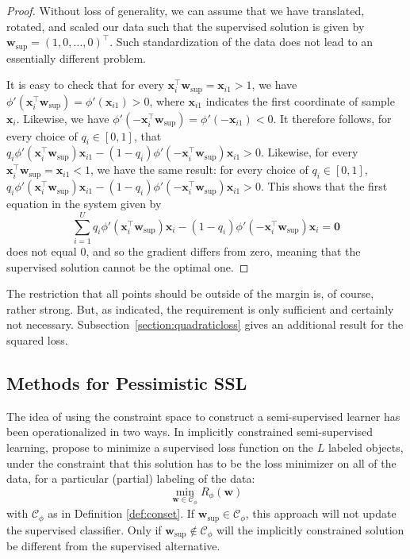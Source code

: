 \documentclass[twoside]{memoir}\usepackage[]{graphicx}\usepackage{xcolor}
\begin{document}
\begin{proof}
Without loss of generality, we can assume that we have translated, rotated, and scaled our data such that the supervised solution is given by $\mathbf{w}_\mathrm{sup} = (1,0,\ldots,0)^\top$.  Such standardization of the data does not lead to an essentially different problem.

It is easy to check that for every $\mathbf{x}_i^\top \mathbf{w}_\mathrm{sup} = \mathbf{x}_{i1}>1$, we have $\phi'(\mathbf{x}_i^\top \mathbf{w}_\mathrm{sup}) = \phi'(\mathbf{x}_{i1}) > 0$, where $\mathbf{x}_{i1}$ indicates the first coordinate of sample $\mathbf{x}_i$.  Likewise, we have $\phi'(-\mathbf{x}_i^\top \mathbf{w}_\mathrm{sup}) = \phi'(-\mathbf{x}_{i1}) < 0$.  It therefore follows, for every choice of $q_i \in [0,1]$, that $q_i \phi'(\mathbf{x}_i^\top \mathbf{w}_\mathrm{sup}) \mathbf{x}_{i1} - (1-q_i) \phi'(-\mathbf{x}_i^\top \mathbf{w}_\mathrm{sup}) \mathbf{x}_{i1} > 0$.  Likewise, for every $\mathbf{x}_i^\top \mathbf{w}_\mathrm{sup} = \mathbf{x}_{i1}<1$, we have the same result: for every choice of $q_i \in [0,1]$, $q_i \phi'(\mathbf{x}_i^\top \mathbf{w}_\mathrm{sup}) \mathbf{x}_{i1} - (1-q_i) \phi'(-\mathbf{x}_i^\top \mathbf{w}_\mathrm{sup}) \mathbf{x}_{i1} > 0$.  This shows that the first equation in the system given by
\[
\sum_{i=1}^U  q_i \phi'(\mathbf{x}_i^\top \mathbf{w}_\mathrm{sup}) \mathbf{x}_i - (1-q_i) \phi'(-\mathbf{x}_i^\top \mathbf{w}_\mathrm{sup}) \mathbf{x}_i = \mathbf{0}
\]
does not equal $0$, and so the gradient differs from zero, meaning that the supervised solution cannot be the optimal one.
\end{proof}

The restriction that all points should be outside of the margin is, of course, rather strong.  But, as indicated, the requirement is only sufficient and certainly not necessary. Subsection~\ref{section:quadraticloss} gives an additional result for the squared loss.



\subsection{Methods for Pessimistic SSL}

The idea of using the constraint space to construct a semi-supervised learner has been operationalized in two ways. In implicitly constrained semi-supervised learning, \citet{Krijthe2017} propose to minimize a supervised loss function on the $L$ labeled objects, under the constraint that this solution has to be the loss minimizer on all of the data, for a particular (partial) labeling of the data:
$$\min_{\mathbf{w} \in \mathcal{C}_\phi} R_\phi(\mathbf{w})$$
with $\mathcal{C}_\phi$ as in Definition \ref{def:conset}.
If $\mathbf{w}_\mathrm{sup} \in \mathcal{C}_\phi$, this approach will not update the supervised classifier. Only if $\mathbf{w}_\mathrm{sup} \notin \mathcal{C}_\phi$ will the implicitly constrained solution be different from the supervised alternative.
\end{document}
